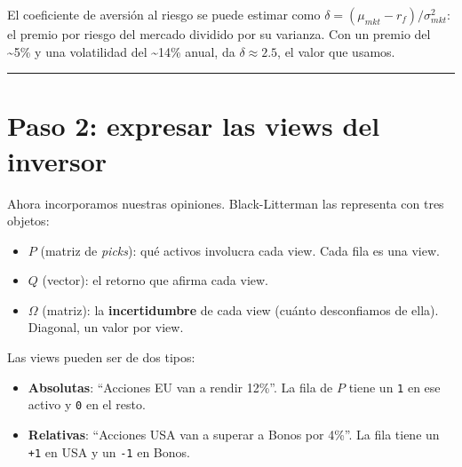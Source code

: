 \documentclass[
  spanish,
  letterpaper,
  DIV=11,
  numbers=noendperiod]{scrreprt}
\providecommand{\tightlist}{%
  \setlength{\itemsep}{0pt}\setlength{\parskip}{0pt}}
\begin{document}
\begin{tcolorbox}[enhanced jigsaw, bottomrule=.15mm, colback=white, opacitybacktitle=0.6, arc=.35mm, toprule=.15mm, opacityback=0, breakable, titlerule=0mm, left=2mm, coltitle=black, colbacktitle=quarto-callout-note-color!10!white, colframe=quarto-callout-note-color-frame, leftrule=.75mm, toptitle=1mm, bottomtitle=1mm, title=\textcolor{quarto-callout-note-color}{\faInfo}\hspace{0.5em}{¿De dónde sale δ?}, rightrule=.15mm]

El coeficiente de aversión al riesgo se puede estimar como
\(\delta = (\mu_{mkt} - r_f) / \sigma_{mkt}^2\): el premio por riesgo
del mercado dividido por su varianza. Con un premio del
\textasciitilde5\% y una volatilidad del \textasciitilde14\% anual, da
\(\delta \approx 2.5\), el valor que usamos.

\end{tcolorbox}

\begin{center}\rule{0.5\linewidth}{0.5pt}\end{center}

\chapter{Paso 2: expresar las views del
inversor}\label{paso-2-expresar-las-views-del-inversor}

Ahora incorporamos nuestras opiniones. Black-Litterman las representa
con tres objetos:

\begin{itemize}
\tightlist
\item
  \textbf{\(P\)} (matriz de \emph{picks}): qué activos involucra cada
  view. Cada fila es una view.
\item
  \textbf{\(Q\)} (vector): el retorno que afirma cada view.
\item
  \textbf{\(\Omega\)} (matriz): la \textbf{incertidumbre} de cada view
  (cuánto desconfiamos de ella). Diagonal, un valor por view.
\end{itemize}

Las views pueden ser de dos tipos:

\begin{itemize}
\tightlist
\item
  \textbf{Absolutas}: ``Acciones EU van a rendir 12\%''. La fila de
  \(P\) tiene un \texttt{1} en ese activo y \texttt{0} en el resto.
\item
  \textbf{Relativas}: ``Acciones USA van a superar a Bonos por 4\%''. La
  fila tiene un \texttt{+1} en USA y un \texttt{-1} en Bonos.
\end{itemize}
\end{document}
